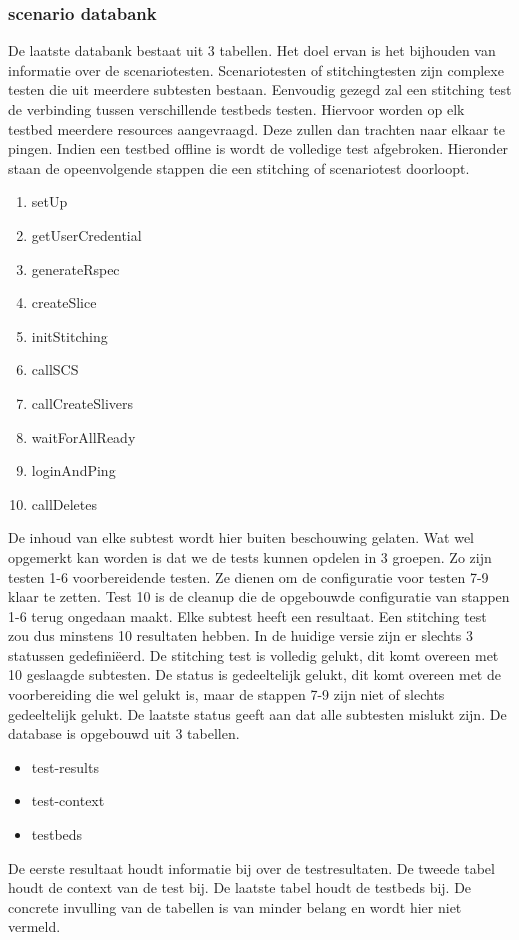 \subsubsection{scenario databank}
\npar
De laatste databank bestaat uit 3 tabellen. Het doel ervan is het bijhouden van informatie over de scenariotesten. Scenariotesten of stitchingtesten zijn complexe testen die uit meerdere subtesten bestaan. Eenvoudig gezegd zal een stitching test de verbinding tussen verschillende testbeds testen. Hiervoor worden op elk testbed meerdere resources aangevraagd. Deze zullen dan trachten naar elkaar te pingen. Indien een testbed offline is wordt de volledige test afgebroken. Hieronder staan de opeenvolgende stappen die een stitching of scenariotest doorloopt.
\begin{enumerate}
\item setUp
\item getUserCredential
\item generateRspec
\item createSlice
\item initStitching
\item callSCS
\item callCreateSlivers
\item waitForAllReady
\item loginAndPing
\item callDeletes
\end{enumerate}
De inhoud van elke subtest wordt hier buiten beschouwing gelaten.
Wat wel opgemerkt kan worden is dat we de tests kunnen opdelen in 3 groepen. Zo zijn testen 1-6 voorbereidende testen. Ze dienen om de configuratie voor testen 7-9 klaar te zetten. Test 10 is de cleanup die de opgebouwde configuratie van stappen 1-6 terug ongedaan maakt.
Elke subtest heeft een resultaat. Een stitching test zou dus minstens 10 resultaten hebben. In de huidige versie zijn er slechts 3 statussen gedefini\"eerd. De stitching test is volledig gelukt, dit komt overeen met 10 geslaagde subtesten. De status is gedeeltelijk gelukt, dit komt overeen met de voorbereiding die wel gelukt is, maar de stappen 7-9 zijn niet of slechts gedeeltelijk gelukt. De laatste status geeft aan dat alle subtesten mislukt zijn.
\npar
De database is opgebouwd uit 3 tabellen.
\begin{itemize}
\item test-results
\item test-context
\item testbeds
\end{itemize}
De eerste resultaat houdt informatie bij over de testresultaten. De tweede tabel houdt de context van de test bij. De laatste tabel houdt de testbeds bij. De concrete invulling van de tabellen is van minder belang en wordt hier niet vermeld.
\clearpage
